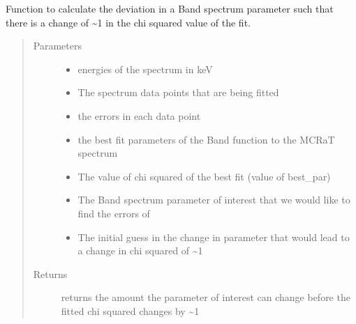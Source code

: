 \documentclass[letterpaper,10pt,english]{sphinxmanual}
\begin{document}
\begin{fulllineitems}
\label{\detokenize{read_process_files:read_process_files.param_err_loop}}
Function to calculate the deviation in a Band spectrum parameter such that there is a change of \textasciitilde{}1 in the chi squared
value of the fit.
\begin{quote}\begin{description}
\item[{Parameters}] \leavevmode\begin{itemize}
\item {} 
 \textendash{} energies of the spectrum in keV

\item {} 
 \textendash{} The spectrum data points that are being fitted

\item {} 
 \textendash{} the errors in each data point

\item {} 
 \textendash{} the best fit parameters of the Band function to the MCRaT spectrum

\item {} 
 \textendash{} The value of chi squared of the best fit (value of best\_par)

\item {} 
 \textendash{} The Band spectrum parameter of interest that we would like to find the errors of

\item {} 
 \textendash{} The initial guess in the change in parameter that would lead to a change in chi squared of \textasciitilde{}1

\end{itemize}

\item[{Returns}] \leavevmode
returns the amount the parameter of interest can change before the fitted chi squared changes by \textasciitilde{}1

\end{description}\end{quote}

\end{fulllineitems}
\end{document}
